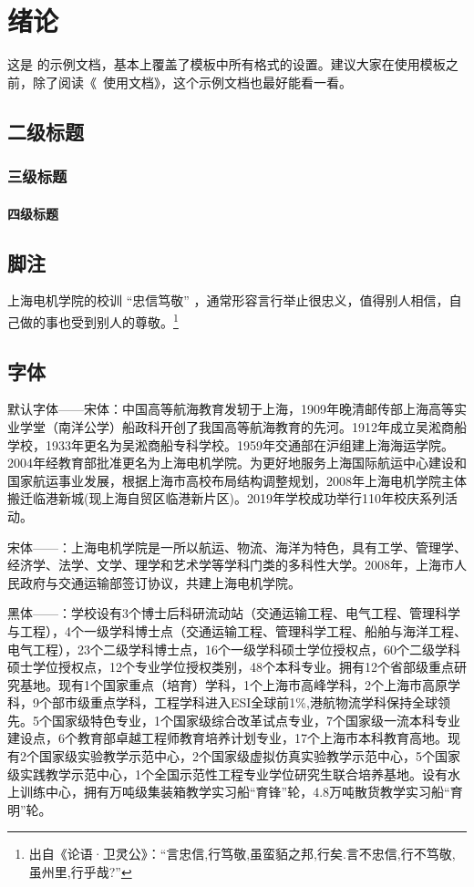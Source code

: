 \chapter{绪论}

这是 \sdjuthesis 的示例文档，基本上覆盖了模板中所有格式的设置。建议大家在使用模板之前，除了阅读《\sdjuthesis\ 使用文档》，这个示例文档也最好能看一看。

\section{二级标题}

\subsection{三级标题}

\subsubsection{四级标题}

\zhlipsum[1-2]

\section{脚注}

上海电机学院的校训 “忠信笃敬” ，通常形容言行举止很忠义，值得别人相信，自己做的事也受到别人的尊敬。\footnote{出自《论语·卫灵公》：“言忠信,行笃敬,虽蛮貊之邦,行矣.言不忠信,行不笃敬,虽州里,行乎哉?”}

\section{字体}
{默认字体——宋体：中国高等航海教育发轫于上海，1909年晚清邮传部上海高等实业学堂（南洋公学）船政科开创了我国高等航海教育的先河。1912年成立吴淞商船学校，1933年更名为吴淞商船专科学校。1959年交通部在沪组建上海海运学院。2004年经教育部批准更名为上海电机学院。为更好地服务上海国际航运中心建设和国家航运事业发展，根据上海市高校布局结构调整规划，2008年上海电机学院主体搬迁临港新城(现上海自贸区临港新片区)。2019年学校成功举行110年校庆系列活动。} 

{宋体——：\songti 上海电机学院是一所以航运、物流、海洋为特色，具有工学、管理学、经济学、法学、文学、理学和艺术学等学科门类的多科性大学。2008年，上海市人民政府与交通运输部签订协议，共建上海电机学院。}

{黑体——：\heiti 学校设有3个博士后科研流动站（交通运输工程、电气工程、管理科学与工程），4个一级学科博士点（交通运输工程、管理科学工程、船舶与海洋工程、电气工程），23个二级学科博士点，16个一级学科硕士学位授权点，60个二级学科硕士学位授权点，12个专业学位授权类别，48个本科专业。拥有12个省部级重点研究基地。现有1个国家重点（培育）学科，1个上海市高峰学科，2个上海市高原学科，9个部市级重点学科，工程学科进入ESI全球前1\%,港航物流学科保持全球领先。5个国家级特色专业，1个国家级综合改革试点专业，7个国家级一流本科专业建设点，6个教育部卓越工程师教育培养计划专业，17个上海市本科教育高地。现有2个国家级实验教学示范中心，2个国家级虚拟仿真实验教学示范中心，5个国家级实践教学示范中心，1个全国示范性工程专业学位研究生联合培养基地。设有水上训练中心，拥有万吨级集装箱教学实习船“育锋”轮，4.8万吨散货教学实习船“育明”轮。}


